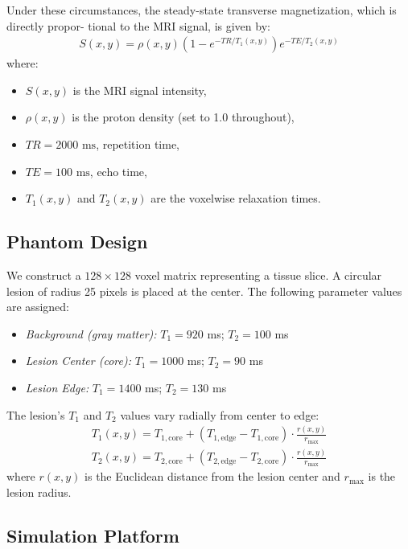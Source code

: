 \documentclass[10pt,a4paper,twoside]{article}
\begin{document}
Under these circumstances, the steady-state transverse magnetization, which is directly propor- tional to the MRI signal, is given by:
\begin{align}
    S(x, y) = \rho(x, y) \left(1 - e^{-TR / T_1(x, y)} \right) e^{-TE / T_2(x, y)}
\end{align}
where:
\begin{itemize}
    \item \(S(x, y)\) is the MRI signal intensity,
    \item \(\rho(x, y)\) is the proton density (set to 1.0 throughout),
    \item \(TR = 2000 \text{ ms}\), repetition time,
    \item \(TE = 100 \text{ ms}\), echo time,
    \item \(T_1(x, y)\) and \(T_2(x, y)\) are the voxelwise relaxation times.
\end{itemize}

\subsection{Phantom Design}

We construct a \(128 \times 128\) voxel matrix representing a tissue slice. A circular lesion of radius 25 pixels is placed at the center. The following parameter values are assigned:

\begin{itemize}
    \item \textit{Background (gray matter):} \(T_1 = 920\) ms; \(T_2 = 100\) ms
    \item \textit{Lesion Center (core):} \(T_1 = 1000\) ms; \(T_2 = 90\) ms
    \item \textit{Lesion Edge:} \(T_1 = 1400\) ms; \(T_2 = 130\) ms
\end{itemize}

\noindent The lesion's \(T_1\) and \(T_2\) values vary radially from center to edge:
\begin{align}
    T_1(x, y) = T_{1,\text{core}} + \left( T_{1,\text{edge}} - T_{1,\text{core}} \right) \cdot \frac{r(x, y)}{r_{\max}} \\
    T_2(x, y) = T_{2,\text{core}} + \left( T_{2,\text{edge}} - T_{2,\text{core}} \right) \cdot \frac{r(x, y)}{r_{\max}}
\end{align}
where \( r(x, y) \) is the Euclidean distance from the lesion center and \( r_{\max} \) is the lesion radius.

\subsection{Simulation Platform}
\end{document}
